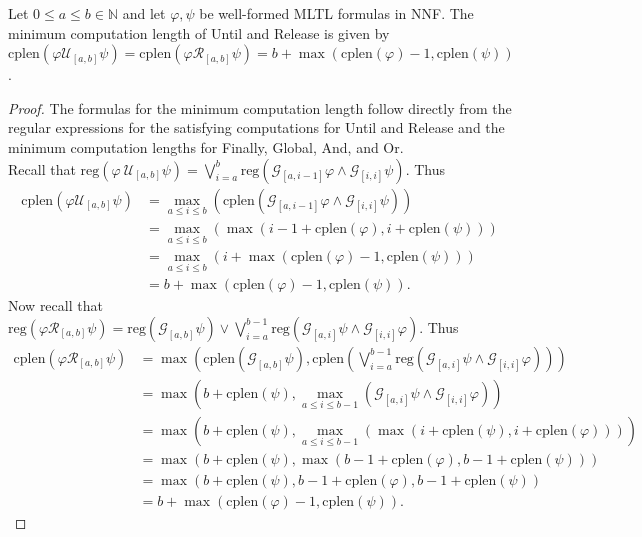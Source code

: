 \documentclass[runningheads]{llncs}
\renewcommand{\phi}{\varphi}
\begin{document}
\vspace{-0.1in}
\begin{theorem}\label{thm1}
    Let $0 \leq a\leq b \in \mathbb{N}$ and let $\phi, \psi$ be well-formed MLTL formulas in NNF. The minimum computation length of Until and Release is given by $\text{cplen}(\phi \mathcal{U}_{[a,b]} \psi) = \text{cplen}(\phi \mathcal{R}_{[a,b]} \psi) = b + \max(\text{cplen}(\phi)-1, \text{cplen}(\psi))$.
\end{theorem}
\vspace{-0.2in}
\begin{proof}
The formulas for the minimum computation length follow directly from the regular expressions for the satisfying computations for Until and Release and the minimum computation lengths for Finally, Global, And, and Or.\\
 Recall that $\text{reg}(\phi \ \mathcal{U}_{[a,b]} \psi) =  \bigvee_{i=a}^{b} \text{reg}\left(\mathcal{G}_{[a,i-1]}\phi \land \mathcal{G}_{[i, i]} \psi\right)$. Thus
 \begin{align*}
     \text{cplen}(\phi \mathcal{U}_{[a,b]} \psi) &= \max_{a \leq i \leq b} \left( \text{cplen}(\mathcal{G}_{[a, i-1]} \phi \land \mathcal{G}_{[i,i]} \psi) \right)\\
     &= \max_{a \leq i \leq b} \left( \max(i-1 + \text{cplen}(\phi), i + \text{cplen}(\psi))\right)\\
     &= \max_{a \leq i \leq b} \left(i + \max(\text{cplen}(\phi) - 1, \text{cplen}(\psi))\right)\\
     &= b + \max(\text{cplen}(\phi) - 1, \text{cplen}(\psi)).
 \end{align*}
 \vspace{-0.1in}
 Now recall that $\text{reg}(\phi \mathcal{R}_{[a,b]} \psi) =  \text{reg}\left(\mathcal{G}_{[a,b]}\psi\right) \lor \bigvee_{i=a}^{b-1} \text{reg}\left(\mathcal{G}_{[a,i]}\psi \land \mathcal{G}_{[i, i]} \phi\right)$. Thus%
\vspace{-0.1in}
 \begin{align*}
     \text{cplen}(\phi \mathcal{R}_{[a,b]} \psi) &= \max \left( \text{cplen}(\mathcal{G}_{[a,b]} \psi), \text{cplen}\left( \bigvee_{i=a}^{b-1} \text{reg}\left(\mathcal{G}_{[a,i]}\psi \land \mathcal{G}_{[i, i]} \phi\right) \right)  \right)\\
     &= \max\left( b + \text{cplen}(\psi), \max_{a \leq i \leq b-1} \left(\mathcal{G}_{[a,i]}\psi \land \mathcal{G}_{[i, i]} \phi\right) \right)\\
     &= \max \left( b + \text{cplen}(\psi), \max_{a \leq i \leq b-1} \left(\max(i + \text{cplen}(\psi), i + \text{cplen}(\phi))\right) \right)\\
     &= \max \left( b + \text{cplen}(\psi), \max(b-1+\text{cplen}(\phi), b-1+\text{cplen}(\psi))\right)\\
     &= \max(b + \text{cplen}(\psi), b-1+\text{cplen}(\phi), b-1+\text{cplen}(\psi))\\
     &= b + \max(\text{cplen}(\phi)-1, \text{cplen}(\psi)). 
 \end{align*}
 \end{proof}
\end{document}
